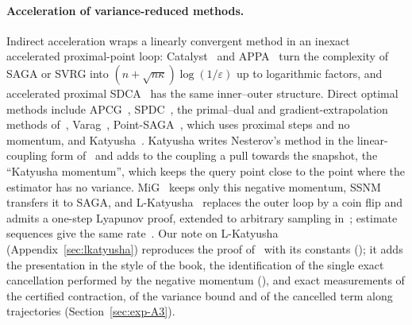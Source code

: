 \paragraph{Acceleration of variance-reduced methods.}
Indirect acceleration wraps a linearly convergent method in an inexact accelerated proximal-point loop:
Catalyst~\cite{lin2015universal,lin2018catalyst} and APPA~\cite{frostig2015unregularizing} turn the complexity of SAGA
or SVRG into $(n+\sqrt{n\kappa})\log(1/\varepsilon)$ up to logarithmic factors, and accelerated proximal
SDCA~\cite{shalevshwartz2014accelerated} has the same inner--outer structure. Direct optimal methods include
APCG~\cite{lin2015accelerated}, SPDC~\cite{zhang2015stochastic}, the primal--dual and gradient-extrapolation methods
of~\cite{lan2018optimal,lan2018random}, Varag~\cite{lan2019unified}, Point-SAGA~\cite{defazio2016simple}, which uses
proximal steps and no momentum, and Katyusha~\cite{allenzhu2018katyusha}. Katyusha writes Nesterov's method in the
linear-coupling form of~\cite{allenzhu2017linear} and adds to the coupling a pull towards the snapshot, the
``Katyusha momentum'', which keeps the query point close to the point where the estimator has no variance.
MiG~\cite{zhou2018simple} keeps only this negative momentum, SSNM~\cite{zhou2019direct} transfers it to SAGA, and
L-Katyusha~\cite{kovalev2020dont} replaces the outer loop by a coin flip and admits a one-step Lyapunov proof,
extended to arbitrary sampling in~\cite{qian2021lsvrg}; estimate sequences give the same
rate~\cite{kulunchakov2019estimate}. Our note on L-Katyusha (Appendix~\ref{sec:lkatyusha}) reproduces the proof
of~\cite{kovalev2020dont} with its constants (); it adds the presentation in the style of the book,
the identification of the single exact cancellation performed by the negative momentum (), and
exact measurements of the certified contraction, of the variance bound and of the cancelled term along trajectories
(Section~\ref{sec:exp-A3}).


